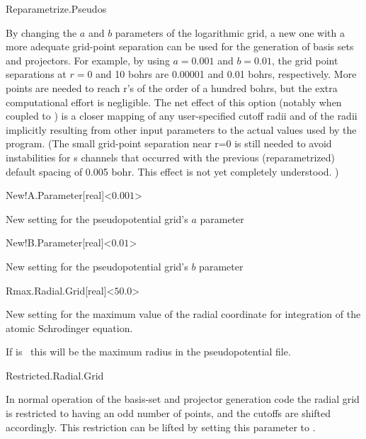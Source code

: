\begin{fdflogicalF}{Reparametrize.Pseudos}

  By changing the $a$ and $b$ parameters of the logarithmic grid, a new
  one with a more adequate grid-point separation can be used for the
  generation of basis sets and projectors. For example, by using
  $a=0.001$ and $b=0.01$, the grid point separations at $r=0$ and 10
  bohrs are 0.00001 and 0.01 bohrs, respectively. More points are needed
  to reach r's of the order of a hundred bohrs, but the extra
  computational effort is negligible.  The net effect of this option
  (notably when coupled to  \fdffalse)
  is a closer mapping of any user-specified cutoff radii and of the
  radii implicitly resulting from other input parameters to the actual
  values used by the program. (The small grid-point separation near r=0
  is still needed to avoid instabilities for s channels that occurred
  with the previous (reparametrized) default spacing of 0.005 bohr. This
  effect is not yet completely understood. )

\end{fdflogicalF}

\begin{fdfentry}{New!A.Parameter}[real]<$0.001$>

  New setting for the pseudopotential grid's $a$ parameter

\end{fdfentry}

\begin{fdfentry}{New!B.Parameter}[real]<$0.01$>

  New setting for the pseudopotential grid's $b$ parameter

\end{fdfentry}

\begin{fdfentry}{Rmax.Radial.Grid}[real]<$50.0$>

  New setting for the maximum value of the radial coordinate for
  integration of the atomic Schrodinger equation.

  If  is \fdffalse\ this will be the
  maximum radius in the pseudopotential file.

\end{fdfentry}

\begin{fdflogicalT}{Restricted.Radial.Grid}
  
  In normal operation of the basis-set and projector generation code
  the radial grid is restricted to having an odd number of points, and
  the cutoffs are shifted accordingly. This restriction can be lifted
  by setting this parameter to \fdffalse.

\end{fdflogicalT}


